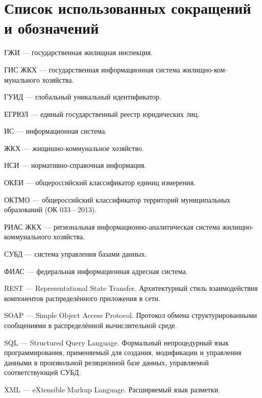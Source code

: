 \section*{Список использованных сокращений и обозначений}

ГЖИ --- государственная жилищная инспекция.

ГИС ЖКХ --- государственная информационная система жилищно-ком-\linebreak мунального хозяйства.

ГУИД --- глобальный уникальный идентификатор.

ЕГРЮЛ --- единый государственный реестр юридических лиц.

ИС --- информационная система.

ЖКХ --- жищишно-коммунальное хозяйство.

НСИ --- нормативно-справочная информация.

ОКЕИ --- общероссийский классификатор единиц измерения.

ОКТМО --- общероссийский классификатор территорий муниципальных образований (ОК 033—2013).

РИАС ЖКХ --- региональная информационно-аналитическая система жилищно-коммунального хозяйства.

СУБД --- система управления базами данных.

ФИАС --- федеральная информационная адресная система.

REST --- Representational State Transfer. Архитектурный стиль взаимодействия компонентов распределённого приложения в сети.

SOAP --- Simple Object Access Protocol. Протокол обмена структурированными сообщениями в распределённой вычислительной среде.

SQL --- Structured Query Language. Формальный непроцедурный язык программирования, применяемый для создания, модификации и управления данными в произвольной реляционной базе данных, управляемой соответствующей СУБД.

XML --- eXtensible Markup Language. Расширяемый язык разметки.

\clearpage
\newpage